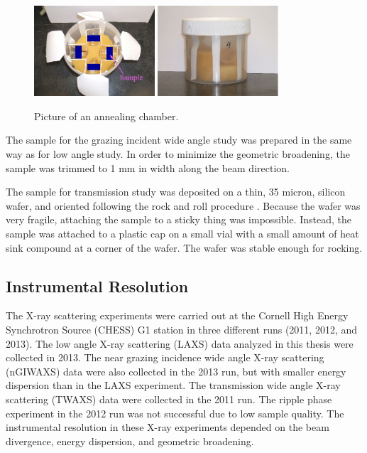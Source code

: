 \begin{figure}[htbp]
  \centering
  \includegraphics[width=0.4\textwidth]{figures/ripple/MMs/annealing_chamber_topview}
  \quad
  \includegraphics[width=0.4\textwidth]{figures/ripple/MMs/annealing_chamber_sideview}  
  \caption[Pictures of an annealing chamber]{Picture of an annealing chamber.}
  \label{fig:annealing_chamber}
\end{figure}

The sample for the grazing incident wide angle study was prepared in the same way 
as for low angle study. In order to minimize the geometric broadening, the 
sample was trimmed to 1 mm in width along the beam direction.

The sample for transmission study was deposited on a thin, 35 micron, silicon
wafer, and oriented following the rock and roll procedure \cite{Tristram-Nagle07_MMB}.  
Because the wafer was very fragile, attaching the sample to a sticky 
thing was impossible. Instead, the sample was attached to a plastic cap on 
a small vial with a small amount of heat sink compound at a corner of the 
wafer. The wafer was stable enough for rocking. 

\subsection{Instrumental Resolution}\label{sec:instrumental_resolution}
The X-ray scattering experiments were carried out at the Cornell 
High Energy Synchrotron Source (CHESS) G1 station in three different runs
(2011, 2012, and 2013). 
The low angle X-ray scattering (LAXS) data analyzed 
in this thesis were collected in 2013.
The near grazing incidence wide angle X-ray scattering (nGIWAXS) data were also collected
in the 2013 run, but with smaller energy dispersion than in the LAXS experiment.
The transmission wide angle X-ray scattering (TWAXS) data were collected
in the 2011 run. The ripple phase experiment in the 2012 run was not successful
due to low sample quality.
The instrumental resolution in these X-ray experiments depended on the beam
divergence, energy dispersion, and geometric broadening. 

